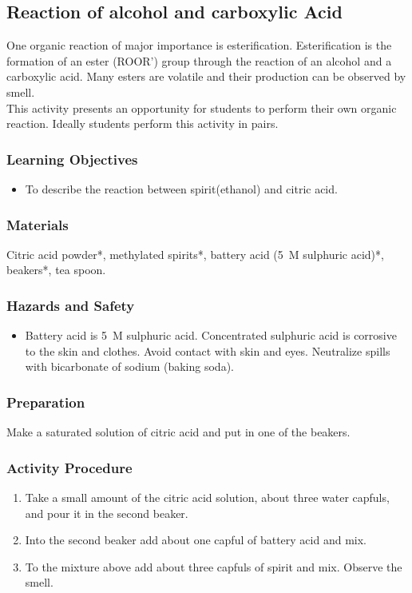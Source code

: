 \subsection{Reaction of alcohol and carboxylic Acid}

One organic reaction of major importance is esterification. Esterification is the formation of an ester (ROOR') group through the reaction of an alcohol and a carboxylic acid. Many esters are volatile and their production can be observed by smell.\\
This activity presents an opportunity for students to perform their own organic reaction. Ideally students perform this activity in pairs.

\subsubsection*{Learning Objectives}
\begin{itemize}
\item{To describe the reaction between spirit(ethanol) and citric acid.}
\end{itemize}

\subsubsection*{Materials}
Citric acid powder*, methylated spirits*, battery acid (5~M sulphuric acid)*, beakers*, tea spoon.

\subsubsection*{Hazards and Safety}
\begin{itemize}
\item{Battery acid is 5~M sulphuric acid. Concentrated sulphuric acid is corrosive to the skin and clothes. Avoid contact with skin and eyes. Neutralize spills with bicarbonate of sodium (baking soda).}
\end{itemize}

\subsubsection*{Preparation}
Make a saturated solution of citric acid and put in one of the beakers.

\subsubsection*{Activity Procedure}
\begin{enumerate}
\item{Take a small amount of the citric acid solution, about three water capfuls, and pour it in the second beaker.}
\item{Into the second beaker add about one capful of battery acid and mix.}
\item{To the mixture above add about three capfuls of spirit and mix. Observe the smell.}
\end{enumerate}

